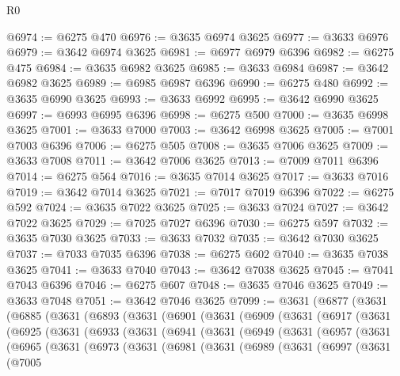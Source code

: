 \begin{lexlean}{R0}
\begin{coremodule}
@6974 := @6275 @470
@6976 := @3635 @6974 @3625
@6977 := @3633 @6976
@6979 := @3642 @6974 @3625
@6981 := @6977 @6979 @6396
@6982 := @6275 @475
@6984 := @3635 @6982 @3625
@6985 := @3633 @6984
@6987 := @3642 @6982 @3625
@6989 := @6985 @6987 @6396
@6990 := @6275 @480
@6992 := @3635 @6990 @3625
@6993 := @3633 @6992
@6995 := @3642 @6990 @3625
@6997 := @6993 @6995 @6396
@6998 := @6275 @500
@7000 := @3635 @6998 @3625
@7001 := @3633 @7000
@7003 := @3642 @6998 @3625
@7005 := @7001 @7003 @6396
@7006 := @6275 @505
@7008 := @3635 @7006 @3625
@7009 := @3633 @7008
@7011 := @3642 @7006 @3625
@7013 := @7009 @7011 @6396
@7014 := @6275 @564
@7016 := @3635 @7014 @3625
@7017 := @3633 @7016
@7019 := @3642 @7014 @3625
@7021 := @7017 @7019 @6396
@7022 := @6275 @592
@7024 := @3635 @7022 @3625
@7025 := @3633 @7024
@7027 := @3642 @7022 @3625
@7029 := @7025 @7027 @6396
@7030 := @6275 @597
@7032 := @3635 @7030 @3625
@7033 := @3633 @7032
@7035 := @3642 @7030 @3625
@7037 := @7033 @7035 @6396
@7038 := @6275 @602
@7040 := @3635 @7038 @3625
@7041 := @3633 @7040
@7043 := @3642 @7038 @3625
@7045 := @7041 @7043 @6396
@7046 := @6275 @607
@7048 := @3635 @7046 @3625
@7049 := @3633 @7048
@7051 := @3642 @7046 @3625
@7099 := @3631
    (@6877
      (@3631
        (@6885
          (@3631
            (@6893
              (@3631
                (@6901
                  (@3631
                    (@6909
                      (@3631
                        (@6917
                          (@3631
                            (@6925
                              (@3631
                                (@6933
                                  (@3631
                                    (@6941
                                      (@3631
                                        (@6949
                                          (@3631
                                            (@6957
                                              (@3631
                                                (@6965
                                                  (@3631
                                                    (@6973
                                                      (@3631
                                                        (@6981
                                                          (@3631
                                                            (@6989
                                                              (@3631
                                                                (@6997
                                                                  (@3631
                                                                    (@7005

\end{coremodule}
\end{lexlean}
